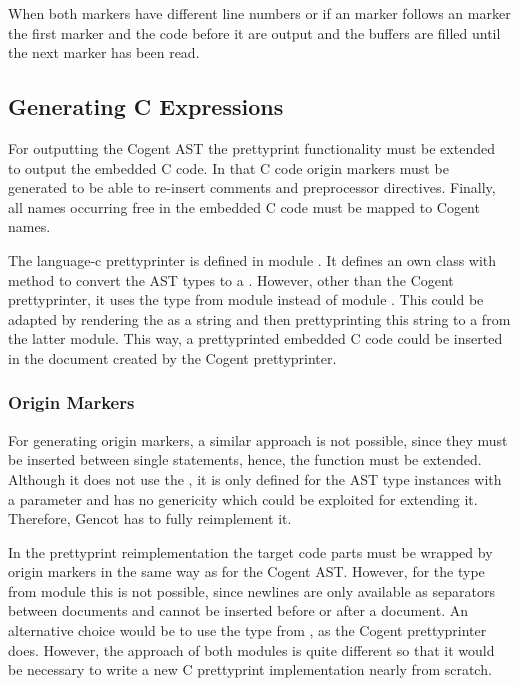 When both markers have different line numbers or if an  marker follows an 
marker the first marker and the code before it are output and the buffers are filled until the next marker
has been read.

\subsection{Generating C Expressions}
\label{impl-ccode-expr}

For outputting the Cogent AST the prettyprint functionality must be extended to 
output the embedded C code. In that C code origin markers must be generated to be able to re-insert comments and 
preprocessor directives. Finally, all names
occurring free in the embedded C code must be mapped to Cogent names.

The language-c prettyprinter is defined in module . It defines an own class  with 
method  to convert the AST types to a . However, other than the Cogent prettyprinter, it uses 
the type  from module  instead of module .
This could be adapted by rendering the  as a string and then prettyprinting this string to a 
from the latter module. This way, a prettyprinted embedded C code could be inserted in the document created by the
Cogent prettyprinter.

\subsubsection{Origin Markers}

For generating origin markers, a similar approach is not possible, since they must be inserted between single statements,
hence, the function  must be extended. Although it does not use the , it is only defined for
the AST type instances with a  parameter and has no genericity which could be exploited for extending it.
Therefore, Gencot has to fully reimplement it. 

In the prettyprint reimplementation the target code parts must be wrapped by origin markers
in the same way as for the Cogent AST. However, for the type  from module  
this is not possible, since newlines are only
available as separators between documents and cannot be inserted before or after a document. An alternative choice
would be to use the type  from , as the Cogent prettyprinter does.
However, the approach of both modules is quite different so that it would be necessary to write a new C 
prettyprint implementation nearly from scratch. 

